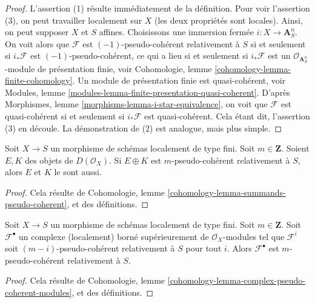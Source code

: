 \begin{proof}
L'assertion (1) résulte immédiatement de la définition. Pour voir l'assertion (3),
on peut travailler localement sur $X$ (les deux propriétés sont locales). Ainsi, on
peut supposer $X$ et $S$ affines. Choisissons une immersion fermée
$i : X \to \mathbf{A}^n_S$. On voit alors que $\mathcal{F}$ est
$(-1)$-pseudo-cohérent relativement à $S$ si et seulement si $i_*\mathcal{F}$
est $(-1)$-pseudo-cohérent, ce qui a lieu si et seulement si $i_*\mathcal{F}$
est un $\mathcal{O}_{\mathbf{A}^n_S}$-module de présentation finie, voir
Cohomologie, lemme \ref{cohomology-lemma-finite-cohomology}.
Un module de présentation finie est quasi-cohérent, voir
Modules, lemme \ref{modules-lemma-finite-presentation-quasi-coherent}.
D'après Morphismes, lemme \ref{morphisms-lemma-i-star-equivalence},
on voit que $\mathcal{F}$ est quasi-cohérent si et seulement si $i_*\mathcal{F}$
est quasi-cohérent. Cela étant dit, l'assertion (3) en découle. La démonstration de (2)
est analogue, mais plus simple.
\end{proof}

\begin{lemma}
\label{lemma-summands-relative-pseudo-coherent}
Soit $X \to S$ un morphisme de schémas localement de type fini.
Soit $m \in \mathbf{Z}$. Soient $E, K$ des objets de $D(\mathcal{O}_X)$.
Si $E \oplus K$ est $m$-pseudo-cohérent relativement à $S$, alors $E$ et $K$ le sont aussi.
\end{lemma}

\begin{proof}
Cela résulte de
Cohomologie, lemme \ref{cohomology-lemma-summands-pseudo-coherent},
et des définitions.
\end{proof}

\begin{lemma}
\label{lemma-complex-relative-pseudo-coherent-modules}
Soit $X \to S$ un morphisme de schémas localement de type fini.
Soit $m \in \mathbf{Z}$. Soit $\mathcal{F}^\bullet$ un complexe (localement) borné
supérieurement de $\mathcal{O}_X$-modules tel que $\mathcal{F}^i$ soit
$(m - i)$-pseudo-cohérent relativement à $S$ pour tout $i$. Alors
$\mathcal{F}^\bullet$ est $m$-pseudo-cohérent relativement à $S$.
\end{lemma}

\begin{proof}
Cela résulte de
Cohomologie, lemme \ref{cohomology-lemma-complex-pseudo-coherent-modules},
et des définitions.
\end{proof}

